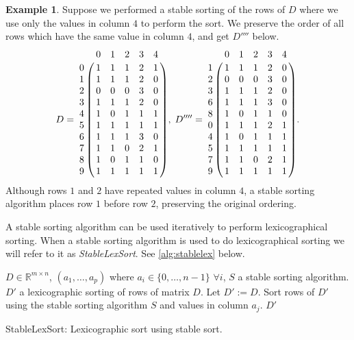 \documentclass[a4paper,10pt,reqno]{amsart}
\newcommand\R{\mathbb R}
\theoremstyle{definition}
\newtheorem{example}{Example}
\begin{document}
\begin{example}
Suppose we performed a stable sorting of the rows of $D$ where we use only the values in
column $4$ to perform the sort.  We preserve the order of all rows which have
the same value in column $4$, and get $D''''$ below.
$$D = 
\bordermatrix{
  & 0 & 1 & 2 & 3 & 4 \cr
0 & 1 & 1 & 1 & 2 & 1 \cr
1 & 1 & 1 & 1 & 2 & 0 \cr
2 & 0 & 0 & 0 & 3 & 0 \cr
3 & 1 & 1 & 1 & 2 & 0 \cr
4 & 1 & 0 & 1 & 1 & 1 \cr
5 & 1 & 1 & 1 & 1 & 1 \cr
6 & 1 & 1 & 1 & 3 & 0 \cr
7 & 1 & 1 & 0 & 2 & 1 \cr
8 & 1 & 0 & 1 & 1 & 0 \cr
9 & 1 & 1 & 1 & 1 & 1 }, \;
D'''' = 
\bordermatrix{
  & 0 & 1 & 2 & 3 & 4 \cr
1 & 1 & 1 & 1 & 2 & 0 \cr
2 & 0 & 0 & 0 & 3 & 0 \cr
3 & 1 & 1 & 1 & 2 & 0 \cr
6 & 1 & 1 & 1 & 3 & 0 \cr
8 & 1 & 0 & 1 & 1 & 0 \cr
0 & 1 & 1 & 1 & 2 & 1 \cr
4 & 1 & 0 & 1 & 1 & 1 \cr
5 & 1 & 1 & 1 & 1 & 1 \cr
7 & 1 & 1 & 0 & 2 & 1 \cr
9 & 1 & 1 & 1 & 1 & 1 }. $$
Although rows $1$ and $2$ have repeated values in column $4$, a stable sorting
algorithm places row $1$ before row $2$, preserving the original
ordering.
\end{example}

A stable sorting algorithm can be used iteratively to perform
lexicographical sorting. When a stable sorting algorithm is used to do
lexicographical sorting we will refer to it as \emph{StableLexSort}.
See \autoref{alg:stablelex} below.

\begin{algorithm}
\begin{algorithmic}[1]
    \REQUIRE $D \in \R^{m\times n}$, $(a_1,\ldots,a_p)$ where $ a_i \in \{0,\ldots,n-1\}$ $\forall i$, $S$ a stable sorting algorithm.
    \ENSURE $D'$ a lexicographic sorting of rows of matrix $D$.
    \STATE Let $D' := D$.
        \STATE Sort rows of $D'$ using the stable sorting algorithm $S$ and values in column $a_j$.
    \ENDFOR
    \RETURN $D'$
\end{algorithmic}
\caption{StableLexSort: Lexicographic sort using stable sort.}
\label{alg:stablelex}
\end{algorithm}
\end{document}
